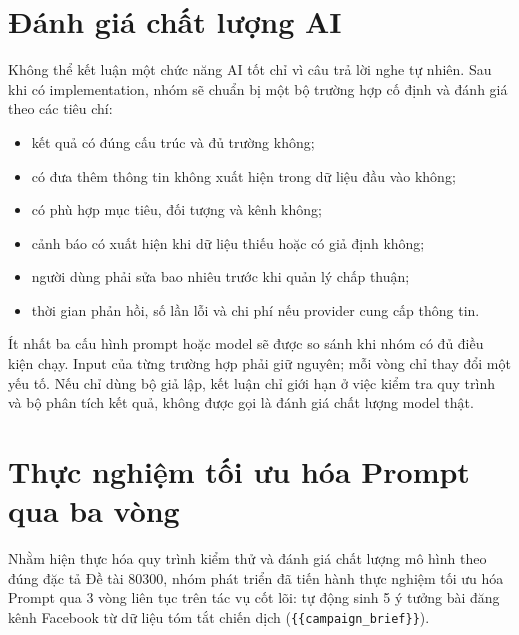 \section{Đánh giá chất lượng AI}

Không thể kết luận một chức năng AI tốt chỉ vì câu trả lời nghe tự nhiên. Sau khi có implementation, nhóm sẽ chuẩn bị một bộ trường hợp cố định và đánh giá theo các tiêu chí:

\begin{itemize}
\item kết quả có đúng cấu trúc và đủ trường không;
\item có đưa thêm thông tin không xuất hiện trong dữ liệu đầu vào không;
\item có phù hợp mục tiêu, đối tượng và kênh không;
\item cảnh báo có xuất hiện khi dữ liệu thiếu hoặc có giả định không;
\item người dùng phải sửa bao nhiêu trước khi quản lý chấp thuận;
\item thời gian phản hồi, số lần lỗi và chi phí nếu provider cung cấp thông tin.
\end{itemize}

Ít nhất ba cấu hình prompt hoặc model sẽ được so sánh khi nhóm có đủ điều kiện chạy. Input của từng trường hợp phải giữ nguyên; mỗi vòng chỉ thay đổi một yếu tố. Nếu chỉ dùng bộ giả lập, kết luận chỉ giới hạn ở việc kiểm tra quy trình và bộ phân tích kết quả, không được gọi là đánh giá chất lượng model thật.

\section{Thực nghiệm tối ưu hóa Prompt qua ba vòng}\label{sec:v8-prompt-optimization-rounds}

Nhằm hiện thực hóa quy trình kiểm thử và đánh giá chất lượng mô hình theo đúng đặc tả Đề tài 80300, nhóm phát triển đã tiến hành thực nghiệm tối ưu hóa Prompt qua 3 vòng liên tục trên tác vụ cốt lõi: tự động sinh 5 ý tưởng bài đăng kênh Facebook từ dữ liệu tóm tắt chiến dịch (\texttt{\{\{campaign\_brief\}\}}).

